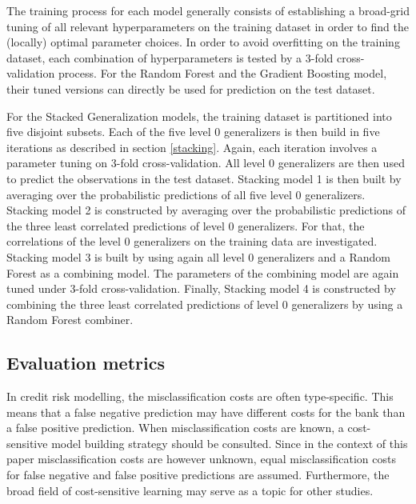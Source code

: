 \documentclass[12pt]{article}
\begin{document}
The training process for each model generally consists of establishing a broad-grid tuning of all relevant hyperparameters on the training dataset in order to find the (locally) optimal parameter choices. In order to avoid overfitting on the training dataset, each combination of hyperparameters is tested by a 3-fold cross-validation process. For the Random Forest and the Gradient Boosting model, their tuned versions can directly be used for prediction on the test dataset.

For the Stacked Generalization models, the training dataset is partitioned into five disjoint subsets. Each of the five level 0 generalizers is then build in five iterations as described in section \ref{stacking}. Again, each iteration involves a parameter tuning on 3-fold cross-validation. All level 0 generalizers are then used to predict the observations in the test dataset. Stacking model 1 is then built by averaging over the probabilistic predictions of all five level 0 generalizers. Stacking model 2 is constructed by averaging over the probabilistic predictions of the three least correlated predictions of level 0 generalizers. For that, the correlations of the level 0 generalizers on the training data are investigated. Stacking model 3 is built by using again all level 0 generalizers and a Random Forest as a combining model. The parameters of the combining model are again tuned under 3-fold cross-validation. Finally, Stacking model 4 is constructed by combining the three least correlated predictions of level 0 generalizers by using a Random Forest combiner.

\subsection{Evaluation metrics}\label{metrics}
In credit risk modelling, the misclassification costs are often type-specific. This means that a false negative prediction may have different costs for the bank than a false positive prediction. When misclassification costs are known, a cost-sensitive model building strategy should be consulted. Since in the context of this paper misclassification costs are however unknown, equal misclassification costs for false negative and false positive predictions are assumed. Furthermore, the broad field of cost-sensitive learning may serve as a topic for other studies. 
\end{document}
